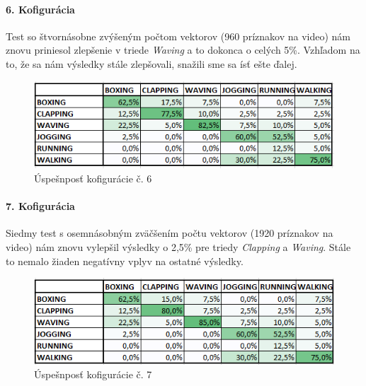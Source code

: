 \paragraph{6. Kofigurácia} 
Test so štvornásobne zvýšeným počtom vektorov (960 príznakov na video) nám znovu priniesol zlepšenie v triede \textit{Waving} a to dokonca o celých 5\%. Vzhľadom na to, že sa nám výsledky stále zlepšovali, snažili sme sa ísť ešte ďalej.
\begin{figure}[H]
  \centering
  \includegraphics[width=14cm]{img/test6PCA4g.png}
  \caption{Úspešnposť kofigurácie č. 6}
  \label{test6}
\end{figure} 

\paragraph{7. Kofigurácia} 
Siedmy test s osemnásobným zväčšením počtu vektorov (1920 príznakov na video) nám znovu vylepšil výsledky o 2,5\% pre triedy \textit{Clapping} a \textit{Waving}. Stále to nemalo žiaden negatívny vplyv na ostatné výsledky.
\begin{figure}[H]
  \centering
  \includegraphics[width=14cm]{img/test6PCA8g.png}
  \caption{Úspešnposť kofigurácie č. 7}
  \label{test7}
\end{figure} 

